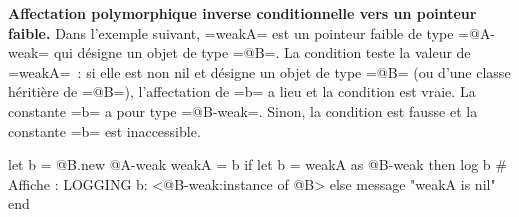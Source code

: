 {\bf Affectation polymorphique inverse conditionnelle vers un pointeur faible.} Dans l'exemple suivant, \ggsq=weakA= est un pointeur faible de type \ggsq=@A-weak= qui désigne un objet de type \ggsq=@B=. La condition teste la valeur de \ggsq=weakA=~: si elle est non nil et désigne un objet de type \ggsq=@B= (ou d'une classe héritière de \ggsq=@B=), l'affectation de \ggsq=b= a lieu et la condition est vraie. La constante \ggsq=b= a pour type \ggsq=@B-weak=. Sinon, la condition est fausse et la constante \ggsq=b= est inaccessible.

\begin{galgas4}
  let b = @B.new
  @A-weak weakA = b
  if let b = weakA as @B-weak then
    log b # Affiche : LOGGING b: <@B-weak:instance of @B>
  else
    message "weakA is nil\n"
  end
\end{galgas4}

